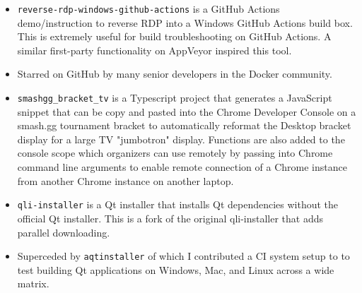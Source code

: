 \documentclass[10pt,letter,ragged2e]{altacv}
\begin{document}
\begin{paracol}{2}
\begin{itemize}
\item \texttt{reverse-rdp-windows-github-actions} is a GitHub Actions demo/instruction to reverse RDP into a Windows GitHub Actions build box. This is extremely useful for build troubleshooting on GitHub Actions. A similar first-party functionality on AppVeyor inspired this tool.
\item Starred on GitHub by many senior developers in the Docker community.
\end{itemize}

\divider


\begin{itemize}
\item \texttt{smashgg\_bracket\_tv} is a Typescript project that generates a JavaScript snippet that can be copy and pasted into the Chrome Developer Console on a smash.gg tournament bracket to automatically reformat the Desktop bracket display for a large TV "jumbotron" display. Functions are also added to the console scope which organizers can use remotely by passing into Chrome command line arguments to enable remote connection of a Chrome instance from another Chrome instance on another laptop.
\end{itemize}

\divider


\begin{itemize}
\item \texttt{qli-installer} is a Qt installer that installs Qt dependencies without the official Qt installer. This is a fork of the original qli-installer that adds parallel downloading.
\item Superceded by \texttt{aqtinstaller} of which I contributed a CI system setup to to test building Qt applications on Windows, Mac, and Linux across a wide matrix.
\end{itemize}





\end{paracol}
\end{document}
